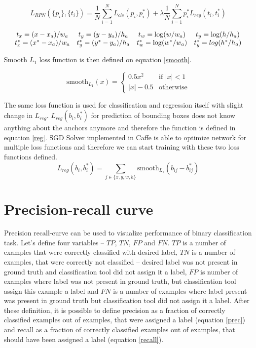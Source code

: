 \begin{equation}
L_{RPN}(\{p_{i}\}, \{t_{i}\}) = \frac{1}{N}\sum_{i=1}^{N}L_{cls}(p_{i}, p^*_{i}) + \lambda\frac{1}{N}\sum_{i=1}^{N}p^*_{i}L_{reg}(t_{i},t^*_{i})
\label{rpnloss}
\end{equation}

\begin{equation}
\begin{array}{c c c c}
t_x = (x- x_a)/w_a & t_y = (y-y_a)/h_a & t_w=\log(w/w_a) & t_y=\log(h/h_a)\\
t_x^* = (x^* - x_a)/w_a & t_y^* = (y^* - y_a)/h_a & t_w^*=\log(w^*/w_a) & t_y^*=log(h^*/h_a)
\end{array}
\label{param}
\end{equation}

Smooth $L_1$ loss function is then defined on equation \ref{smooth}.

\begin{equation}
\text{smooth}_{L_1}(x) = \left\{
\begin{array}{ll}
0.5x^2 & \mbox{if } |x| < 1 \\
|x| - 0.5 & \mbox{otherwise}
\end{array}
\right .
\label{smooth}
\end{equation}

The same loss function is used for classification and regression itself with slight change in $L_{reg}$. $L_{reg}(b_i,b_i^*)$ for prediction of bounding boxes does not know anything about the anchors anymore and therefore the function is defined in equation \ref{reg}. SGD Solver implemented in Caffe is able to optimize network for multiple loss functions and therefore we can start training with these two loss functions defined.
\begin{equation}
L_{reg}(b_i,b^*_i) = \sum_{j\in\{x,y,w,h\}}\text{smooth}_{L_1}(b_{ij} - b_{ij}^*)
\label{reg}
\end{equation}

\section{Precision-recall curve}
Precision recall-curve can be used to visualize performance of binary classification task. Let's define four variables -- $TP$, $TN$, $FP$ and $FN$. $TP$ is a number of examples that were correctly classified with desired label, $TN$ is a number of examples, that were correctly not classified -- desired label was not present in ground truth and classification tool did not assign it a label, $FP$ is number of examples where label was not present in ground truth, but classification tool assign this example a label and $FN$ is a number of examples where label present was present in ground truth but classification tool did not assign it a label. After these definition, it is possible to define precision as a fraction of correctly classified examples out of examples, that were assigned a label (equation \ref{prec}) and recall as a fraction of correctly classified examples out of examples, that should have been assigned a label (equation \ref{recall}).

